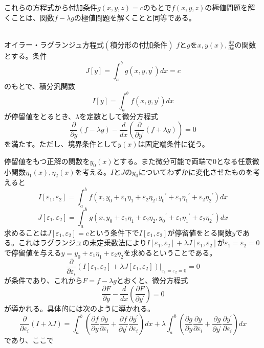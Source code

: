 \documentclass{jsarticle}
\begin{document}
これらの方程式から付加条件\(g(x,y,z)=c\)のもとで\(f(x,y,z)\)の極値問題を解くことは、関数\(f-\lambda g\)の極値問題を解くことと同等である。\\
\\
\begin{itembox}[l]{オイラー・ラグランジュ方程式\((積分形の付加条件)\)}
\(f\)と\(g\)を\(x,y(x),\frac{dy}{dx}\)の関数とする。条件
\[J[y]=\int_{a}^{b}g(x,y,y^{\prime})dx=c\]
のもとで、積分汎関数
\[I[y]=\int_{a}^{b}f(x,y,y^{\prime})dx\]
が停留値をとるとき、\(\lambda\)を定数として微分方程式
\[\frac{\partial}{\partial y}(f-\lambda g)-\frac{d}{dx}\left(\frac{\partial}{\partial y^{\prime}}(f+\lambda g)\right)=0\]
を満たす。ただし、境界条件として\(y(x)\)は固定端条件に従う。
\end{itembox}
停留値をもつ正解の関数を\(y_{0}(x)\)とする。また微分可能で両端で\(0\)となる任意微小関数\(\eta_{1}(x),\eta_{2}(x)\)を考える。\(I\)と\(J\)の\(y_{0}\)についてわずかに変化させたものを考えると
\[I[\varepsilon_{1},\varepsilon_{2}]=\int_{a}^{b}f(x,y_{0}+\varepsilon_{1}\eta_{1}+\varepsilon_{2}\eta_{2},{y_{0}}^{\prime}+\varepsilon_{1}{\eta_{1}}^{\prime}+\varepsilon_{2}{\eta_{2}}^{\prime})dx\]
\[J[\varepsilon_{1},\varepsilon_{2}]=\int_{a}^{b}g(x,y_{0}+\varepsilon_{1}\eta_{1}+\varepsilon_{2}\eta_{2},{y_{0}}^{\prime}+\varepsilon_{1}{\eta_{1}}^{\prime}+\varepsilon_{2}{\eta_{2}}^{\prime})dx\]
求めることは\(J[\varepsilon_{1},\varepsilon_{2}]=c\)という条件下で\(I[\varepsilon_{1},\varepsilon_{2}]\)が停留値をとる関数\(y\)である。これはラグランジュの未定乗数法により\(I[\varepsilon_{1},\varepsilon_{2}]+\lambda J[\varepsilon_{1},\varepsilon_{2}]\)が\(\varepsilon_{1}=\varepsilon_{2}=0\)で停留値を与える\(y=y_{0}+\varepsilon_{1}\eta_{1}+\varepsilon_{2}\eta_{2}\)を求めるということである。
\[\frac{\partial}{\partial\varepsilon_{i}}\left(I[\varepsilon_{1},\varepsilon_{2}]+\lambda J[\varepsilon_{1},\varepsilon_{2}]\right)\Big|_{\varepsilon_{1}=\varepsilon_{2}=0}=0\]
が条件であり、これから\(F=f-\lambda g\)とおくと、微分方程式
\[\frac{\partial F}{\partial y}-\frac{d}{dx}\left(\frac{\partial F}{\partial y^{\prime}}\right)=0\]
が導かれる。具体的には次のように導かれる。
\[\frac{\partial}{\partial\varepsilon_{i}}(I+\lambda J)=\int_{a}^{b}\left(\frac{\partial f}{\partial y}\frac{\partial y}{\partial\varepsilon_{i}}+\frac{\partial f}{\partial y^{\prime}}\frac{\partial y^{\prime}}{\partial\varepsilon_{i}}\right)dx+\lambda\int_{a}^{b}\left(\frac{\partial g}{\partial y}\frac{\partial
 y}{\partial\varepsilon_{i}}+\frac{\partial g}{\partial y^{\prime}}\frac{\partial y^{\prime}}{\partial\varepsilon_{i}}\right)dx\]
であり、ここで
\end{document}
